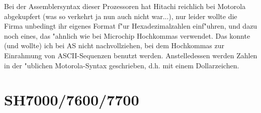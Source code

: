\documentclass[12pt,a4paper,twoside]{report}
\begin{document}
Bei der Assemblersyntax dieser Prozessoren hat Hitachi reichlich
bei Motorola abgekupfert (was so verkehrt ja nun auch nicht war...),
nur leider wollte die Firma unbedingt ihr eigenes Format f"ur
Hexadezimalzahlen einf"uhren, und dazu noch eines, das "ahnlich wie
bei Microchip Hochkommas verwendet.  Das konnte (und wollte) ich bei
AS nicht nachvollziehen, bei dem Hochkommas zur Einrahmung von
ASCII-Sequenzen benutzt werden.  Anstelledessen werden Zahlen in der
"ublichen Motorola-Syntax geschrieben, d.h. mit einem Dollarzeichen.


\section{SH7000/7600/7700}
\end{document}
